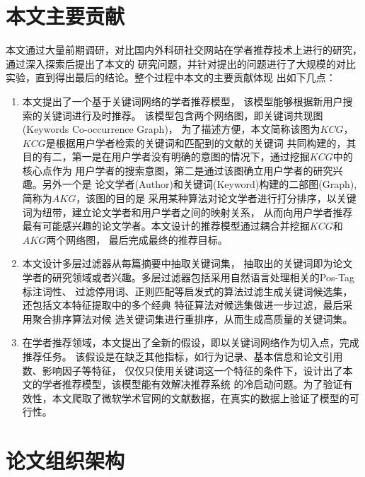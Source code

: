 \section{本文主要贡献}
本文通过大量前期调研，对比国内外科研社交网站在学者推荐技术上进行的研究，通过深入探索后提出了本文的%
研究问题，并针对提出的问题进行了大规模的对比实验，直到得出最后的结论。整个过程中本文的主要贡献体现%
出如下几点：
\begin{enumerate}
    \item 本文提出了一个基于关键词网络的学者推荐模型，%
          该模型能够根据新用户搜索的关键词进行及时推荐。%
          该模型包含两个网络图，即关键词共现图(Keywords Co-occurrence Graph)，%
          为了描述方便，本文简称该图为$KCG$，$KCG$是根据用户学者检索的关键词和匹配到的文献的关键词%
          共同构建的，其目的有二，第一是在用户学者没有明确的意图的情况下，通过挖掘$KCG$中的核心点作为%
          用户学者的搜索意图，第二是通过该图确立用户学者的研究兴趣。另外一个是
          论文学者(Author)和关键词(Keyword)构建的二部图(Graph),简称为$AKG$，该图的目的是%
          采用某种算法对论文学者进行打分排序，以关键词为纽带，建立论文学者和用户学者之间的映射关系，%
          从而向用户学者推荐最有可能感兴趣的论文学者。本文设计的推荐模型通过耦合并挖掘$KCG$和$AKG$两个网络图，%
          最后完成最终的推荐目标。
    \item 本文设计多层过滤器从每篇摘要中抽取关键词集，%
          抽取出的关键词即为论文学者的研究领域或者兴趣。多层过滤器包括采用自然语言处理相关的Pos-Tag标注词性、%
          过滤停用词、正则匹配等启发式的算法过滤生成关键词候选集，还包括文本特征提取中的多个经典%
          特征算法对候选集做进一步过滤，最后采用聚合排序算法对候%
          选关键词集进行重排序，从而生成高质量的关键词集。%
    \item 在学者推荐领域，本文提出了全新的假设，即以关键词网络作为切入点，完成推荐任务。%
          该假设是在缺乏其他指标，如行为记录、基本信息和论文引用数、影响因子等特征，%
          仅仅只使用关键词这一个特征的条件下，设计出了本文的学者推荐模型，该模型能有效解决推荐系统%
          的冷启动问题。为了验证有效性，本文爬取了微软学术官网的文献数据，在真实的数据上验证了模型的可行性。

\end{enumerate}


\section{论文组织架构}

